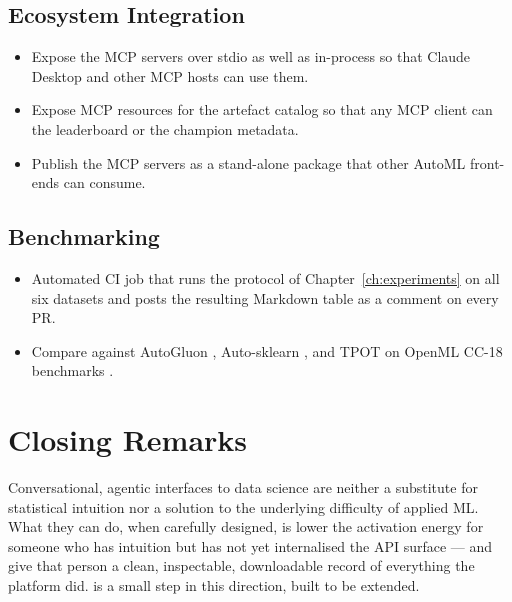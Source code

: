 \subsection{Ecosystem Integration}
\label{sec:future-ecosystem}

\begin{itemize}[leftmargin=1.4em]
  \item \propd{} Expose the MCP servers over stdio as well as
        in-process so that Claude Desktop and other MCP hosts can
        use them.
  \item \propd{} Expose MCP resources for the artefact catalog so
        that any MCP client can  the leaderboard
        or the champion metadata.
  \item \future{} Publish the MCP servers as a stand-alone package
        that other AutoML front-ends can consume.
\end{itemize}

\subsection{Benchmarking}
\label{sec:future-bench}

\begin{itemize}[leftmargin=1.4em]
  \item \propd{} Automated CI job that runs the protocol of
        Chapter~\ref{ch:experiments} on all six datasets and posts
        the resulting Markdown table as a comment on every PR.
  \item \future{} Compare \projname{} against AutoGluon
        \citep{erickson2020autogluon}, Auto-sklearn
        \citep{feurer2015autosklearn}, and TPOT
        \citep{olson2016tpot} on OpenML CC-18 benchmarks
        \citep{bischl2021openml}.
\end{itemize}

\section{Closing Remarks}
\label{sec:closing}

Conversational, agentic interfaces to data science are neither a
substitute for statistical intuition nor a solution to the
underlying difficulty of applied ML. What they can do, when
carefully designed, is lower the activation energy for someone who
has intuition but has not yet internalised the API surface --- and
give that person a clean, inspectable, downloadable record of
everything the platform did. \projname{} is a small step in this
direction, built to be extended.
